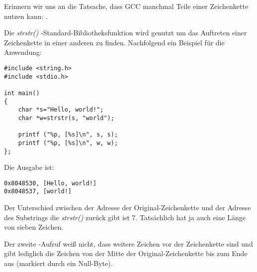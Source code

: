 \label{strstr_example}

Erinnern wir uns an die Tatsache, dass GCC manchmal Teile einer Zeichenkette nutzen kann: .

Die \emph{strstr()} \CCpp-Standard-Bibliotheksfunktion wird genutzt um das Auftreten einer Zeichenkette
in einer anderen zu finden.
Nachfolgend ein Beispiel für die Anwendung:

\begin{lstlisting}[style=customc]
#include <string.h>
#include <stdio.h>

int main()
{
	char *s="Hello, world!";
	char *w=strstr(s, "world");

	printf ("%p, [%s]\n", s, s);
	printf ("%p, [%s]\n", w, w);
};
\end{lstlisting}

Die Ausgabe ist:

\begin{lstlisting}
0x8048530, [Hello, world!]
0x8048537, [world!]
\end{lstlisting}

Der Unterschied zwischen der Adresse der Original-Zeichenkette und der Adresse des Substrings die
\emph{strstr()} zurück gibt ist 7.
Tatsächlich hat  ja auch eine Länge von sieben Zeichen.

Der zweite \printf-Aufruf weiß nicht, dass weitere Zeichen vor der Zeichenkette sind und gibt lediglich die
Zeichen von der Mitte der Original-Zeichenkette bis zum Ende aus (markiert durch ein Null-Byte).
